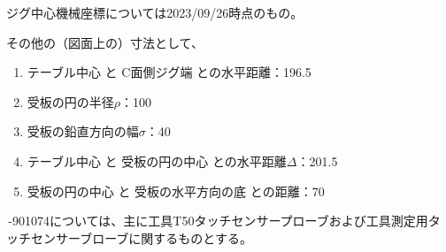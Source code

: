 \begin{marker}
ジグ中心機械座標については2023/09/26時点のもの。
\end{marker}
\clearpage
\begin{hosoku}
その他の（図面上の）寸法として、
\begin{enumerate}
\item テーブル中心 と C面側ジグ端 との水平距離：196.5
\item 受板の円の半径$\rho$：100
\item 受板の鉛直方向の幅$\sigma$：40
\item テーブル中心 と 受板の円の中心 との水平距離$\varDelta$：201.5
\item 受板の円の中心 と 受板の水平方向の底 との距離：70
\end{enumerate}
\end{hosoku}



\clearpage
\,-\ttNum901074については、主に工具{\ttfamily T50}タッチセンサープローブおよび工具測定用タッチセンサーブローブに関するものとする。\\

